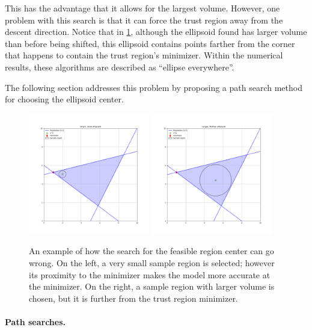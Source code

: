 This has the advantage that it allows for the largest volume.
However, one problem with this search is that it can force the trust region away from the descent direction.
Notice that in \cref{ellipse_runs_away}, although the ellipsoid found has larger volume than before being shifted, 
this ellipsoid contains points farther from the corner that happens to contain the trust region's minimizer.
Within the numerical results, these algorithms are described as ``ellipse everywhere''.

The following section addresses this problem by proposing a path search method for choosing the ellipsoid center.

\begin{figure}[ht]
    \centering
    \includegraphics[width=200px]{images/worse_larger_ellipsoid_1.png}
    \includegraphics[width=200px]{images/worse_larger_ellipsoid_2.png}
    \caption[An example of how the search for the sample region center can go wrong.]{
    	An example of how the search for the feasible region center can go wrong.  
     	On the left, a very small sample region is selected; however its proximity to the minimizer makes the model more accurate at the minimizer.
    	On the right, a sample region with larger volume is chosen, but it is further from the trust region minimizer.
	}
    \label{ellipse_runs_away}
\end{figure}


\paragraph{Path searches.}

